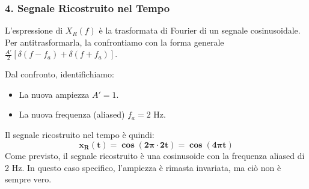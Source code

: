 \begin{soluzione}{9}
    \subsubsection*{4. Segnale Ricostruito nel Tempo}
    L'espressione di $X_R(f)$ è la trasformata di Fourier di un segnale cosinusoidale. Per antitrasformarla, la confrontiamo con la forma generale $\frac{A'}{2}[\delta(f-f_a) + \delta(f+f_a)]$.
    
    Dal confronto, identifichiamo:
    \begin{itemize}
        \item La nuova ampiezza $A' = 1$.
        \item La nuova frequenza (aliased) $f_a = 2$ Hz.
    \end{itemize}
    Il segnale ricostruito nel tempo è quindi:
    \[
        \mathbf{x_R(t) = \cos(2\pi \cdot 2t) = \cos(4\pi t)}
    \]
    Come previsto, il segnale ricostruito è una cosinusoide con la frequenza aliased di 2 Hz. In questo caso specifico, l'ampiezza è rimasta invariata, ma ciò non è sempre vero.
    
\end{soluzione}